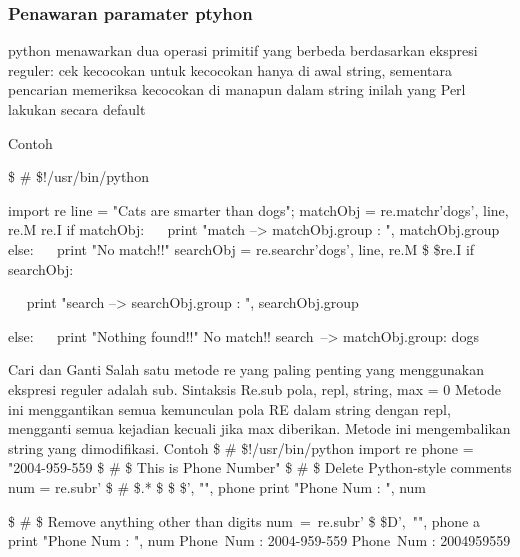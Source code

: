 \subsubsection{Penawaran paramater ptyhon}
python menawarkan dua operasi primitif yang berbeda berdasarkan ekspresi reguler: cek kecocokan untuk kecocokan hanya di awal string, sementara pencarian memeriksa kecocokan di manapun dalam string {inilah yang Perl lakukan secara default}

Contoh 

 \$  \#  \$!/usr/bin/python \par
import re 
line = "Cats are smarter than dogs"; 
matchObj = re.match{r'dogs', line, re.M  \vert  re.I}  
if matchObj: 
~~ print "match --> matchObj.group{} : ", matchObj.group{} 
else: 
~~ print "No match!!" 
searchObj = re.search{r'dogs', line, re.M \$  \vert  \$re.I} 
if searchObj: 
\item
~~ print "search --> searchObj.group{} : ", searchObj.group{} 
\item
else: 
~~ print "Nothing found!!" 
No match!!
search~--> matchObj.group{}:  dogs 
\item
Cari dan Ganti 
Salah satu metode re yang paling penting yang menggunakan ekspresi reguler adalah sub.  
Sintaksis 
Re.sub {pola, repl, string, max = 0} 
Metode ini menggantikan semua kemunculan pola RE dalam string dengan repl, mengganti semua kejadian kecuali jika max diberikan. Metode ini mengembalikan string yang dimodifikasi. 
Contoh 
 \$  \#  \$!/usr/bin/python 
import re 
phone = "2004-959-559  \$  \#  \$ This is Phone Number" 
 \$  \#  \$ Delete Python-style comments 
num = re.sub{r' \$  \#  \$.* \$  \$  \$', "", phone} 
print "Phone Num : ", num 
\item
 \$  \#  \$ Remove anything other than digits 
num~=~re.sub{r' \$  \setminus  \$D',~"", phone}     a
print "Phone Num : ", num  
Phone~Num :  2004-959-559 
Phone~Num :  2004959559 
